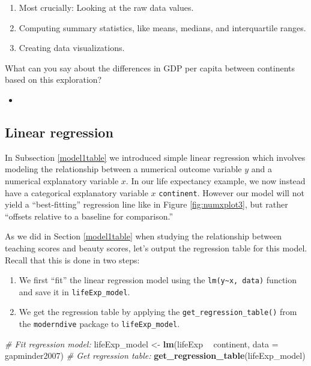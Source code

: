 \documentclass[12pt, krantz2,]{krantz}
\makeatletter
\newenvironment{Shaded}{\begin{snugshade}}{\end{snugshade}}
\newcommand{\CommentTok}[1]{\textcolor[rgb]{0.37,0.37,0.37}{\textit{#1}}}
\newcommand{\DataTypeTok}[1]{\textcolor[rgb]{0.27,0.27,0.27}{#1}}
\newcommand{\KeywordTok}[1]{\textcolor[rgb]{0.27,0.27,0.27}{\textbf{#1}}}
\newcommand{\NormalTok}[1]{#1}
\newcommand{\OperatorTok}[1]{\textcolor[rgb]{0.43,0.43,0.43}{\textbf{#1}}}
\newcommand{\StringTok}[1]{\textcolor[rgb]{0.5,0.5,0.5}{#1}}
\providecommand{\tightlist}{%
  \setlength{\itemsep}{0pt}\setlength{\parskip}{0pt}}
\newenvironment{kframe}{%
\medskip{}
\setlength{\fboxsep}{.8em}
 \def\at@end@of@kframe{}%
 \ifinner\ifhmode%
  \def\at@end@of@kframe{\end{minipage}}%
  \begin{minipage}{\columnwidth}%
 \fi\fi%
 \def\FrameCommand##1{\hskip\@totalleftmargin \hskip-\fboxsep
 \colorbox{shadecolor}{##1}\hskip-\fboxsep
     \hskip-\linewidth \hskip-\@totalleftmargin \hskip\columnwidth}%
 \MakeFramed {\advance\hsize-\width
   \@totalleftmargin\z@ \linewidth\hsize
   \@setminipage}}%
 {\par\unskip\endMakeFramed%
 \at@end@of@kframe}
\renewenvironment{Shaded}{\begin{kframe}}{\end{kframe}}
\newenvironment{rmdblock}[1]
  {\begin{shaded*}
  \begin{itemize}
  \renewcommand{\labelitemi}{
    \raisebox{-.7\height}[0pt][0pt]{
    }
  }
  \item
  }
  {
  \end{itemize}
  \end{shaded*}
  }
\newenvironment{learncheck}
  {\begin{rmdblock}{warning}}
  {\end{rmdblock}}
\makeatother
\begin{document}
\begin{enumerate}
\def\labelenumi{\arabic{enumi}.}
\tightlist
\item
  Most crucially: Looking at the raw data values.
\item
  Computing summary statistics, like means, medians, and interquartile ranges.
\item
  Creating data visualizations.
\end{enumerate}

What can you say about the differences in GDP per capita between continents based on this exploration?

\begin{learncheck}

\end{learncheck}

\hypertarget{model2table}{%
\subsection{Linear regression}\label{model2table}}

In Subsection \ref{model1table} we introduced simple linear regression which involves modeling the relationship between a numerical outcome variable \(y\) and a numerical explanatory variable \(x\). In our life expectancy example, we now instead have a categorical explanatory variable \(x\) \texttt{continent}. However our model will not yield a ``best-fitting'' regression line like in Figure \ref{fig:numxplot3}, but rather ``offsets relative to a baseline for comparison.''

As we did in Section \ref{model1table} when studying the relationship between teaching scores and beauty scores, let's output the regression table for this model. Recall that this is done in two steps:

\begin{enumerate}
\def\labelenumi{\arabic{enumi}.}
\tightlist
\item
  We first ``fit'' the linear regression model using the \texttt{lm(y\textasciitilde{}x,\ data)} function and save it in \texttt{lifeExp\_model}.
\item
  We get the regression table by applying the \texttt{get\_regression\_table()} from the \texttt{moderndive} package to \texttt{lifeExp\_model}.
\end{enumerate}

\begin{Shaded}
\begin{Highlighting}[]
\CommentTok{# Fit regression model:}
\NormalTok{lifeExp_model <-}\StringTok{ }\KeywordTok{lm}\NormalTok{(lifeExp }\OperatorTok{~}\StringTok{ }\NormalTok{continent, }\DataTypeTok{data =}\NormalTok{ gapminder2007)}
\CommentTok{# Get regression table:}
\KeywordTok{get_regression_table}\NormalTok{(lifeExp_model)}
\end{Highlighting}
\end{Shaded}
\end{document}
